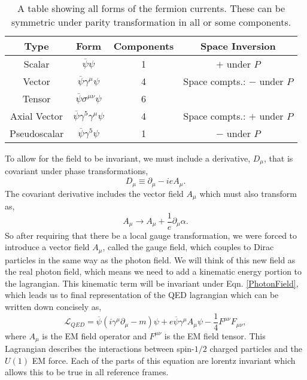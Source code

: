 \begin{table}
\centering
\begin{tabular}{|c|c|c|c|}
\hline
Type & Form & Components & Space Inversion \\
\hline
\hline
 Scalar &  $\overline{\psi}\psi$ &  1 & $+$ under $P$ \\
 Vector & $\overline{\psi}\gamma^\mu\psi$ & 4 & Space compts.: $-$ under $P$ \\
 Tensor & $\overline{\psi}\sigma^{\mu\nu}\psi$ & 6 &  \\
 Axial Vector & $\overline{\psi}\gamma^5\gamma^\mu\psi$ & 4 & Space compts.: $+$ under $P$ \\
 Pseudoscalar & $\overline{\psi}\gamma^5\psi$ & 1 & $-$ under $P$ \\
 \hline
\end{tabular}
\caption[Fermion Currents]{A table showing all forms of the fermion currents. These can be symmetric under parity transformation in all or some components.}
\label{Transformations}
\end{table}

To allow for the field to be invariant, we must include a derivative, $D_\mu$, that is covariant under phase transformations,
 \begin{equation}\label{QEDCovariantD}
 D_\mu\equiv\partial_\mu-ieA_\mu.
 \end{equation}
 The covariant derivative includes the vector field $A_\mu$ which must also transform as,
  \begin{equation}\label{PhotonField}
 A_\mu\rightarrow A_\mu+\frac{1}{e}\partial_\mu\alpha.
 \end{equation}
 So after requiring that there be a local gauge transformation, we were forced to introduce a vector field $A_\mu$, called the gauge field, which couples to Dirac particles in the same way as the photon field. We will think of this new field as the real photon field, which means we need to add a kinematic energy portion to the lagrangian. This kinematic term will be invariant under Eqn. \ref{PhotonField}, which leads us to final representation of the QED lagrangian which can be written down concisely as, 
\begin{equation}\label{LagrangianQED}
\mathcal{L}_{QED}=\overline{\psi}(i\gamma^\mu\partial_\mu-m)\psi+e\overline{\psi}\gamma^{\mu}A_{\mu}\psi-\frac{1}{4}F^{\mu\nu}F_{\mu\nu},
\end{equation}
where $A_{\mu}$ is the EM field operator and $F^{\mu\nu}$ is the EM field tensor. This Lagrangian describes the interactions between spin-$1/2$ charged particles and the $U(1)$ EM force. Each of the parts of this equation are lorentz invariant which allows this to be true in all reference frames. 

